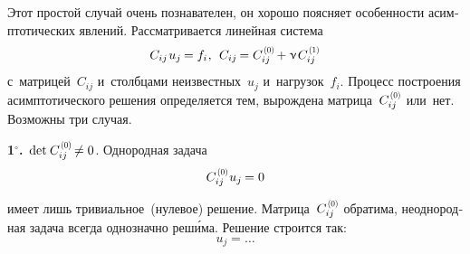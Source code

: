 

\begin{otherlanguage}{russian}

Этот простой случай очень познавателен, он хорошо поясняет особенности асимптотических явлений. Рассматривается линейная система
\begin{equation}
C_{ij} \hspace{.2ex} u_{j} \hspace{-0.16ex} = f_{i} \hspace{.1ex} , \:\:
C_{ij} \hspace{-0.2ex} = C_{ij}^{\hspace{0.2ex}\scalebox{0.66}[0.66]{(0)}} \hspace{-0.2ex} + \smallparameter \hspace{.2ex} C_{ij}^{\hspace{0.2ex}\scalebox{0.66}[0.66]{(1)}}
\end{equation}
\noindent с~матрицей~$C_{ij}$ и~столбцами неизвестных~$u_j$ и~нагрузок~$f_i$. Процесс построения асимптотического решения определяется тем, вырождена матрица~${C_{ij}^{\hspace{0.2ex}\scalebox{0.66}[0.66]{(0)}}}$ или~нет. Возможны три случая.

\indent \textbf{1$^{\circ}$\hspace{-1ex}.}\, ${\operatorname{det} \hspace{.16ex} C_{ij}^{\hspace{0.2ex}\scalebox{0.66}[0.66]{(0)}} \hspace{-0.25ex} \neq 0}$. Однородная задача
\vspace{-0.2em}\begin{equation}
C_{ij}^{\hspace{0.2ex}\scalebox{0.66}[0.66]{(0)}} \hspace{.1ex} u_{j} \hspace{-0.16ex} = 0
\end{equation}

\vspace{-0.5em} \noindent имеет лишь тривиальное~(нулевое) решение.
Матрица~${C_{ij}^{\hspace{0.2ex}\scalebox{0.66}[0.66]{(0)}}}$ обратима, неоднородная задача всегда однозначно реш\'{и}ма. Решение строится так:
\begin{equation}
u_{j} = \ldots
\end{equation}


\end{otherlanguage}
